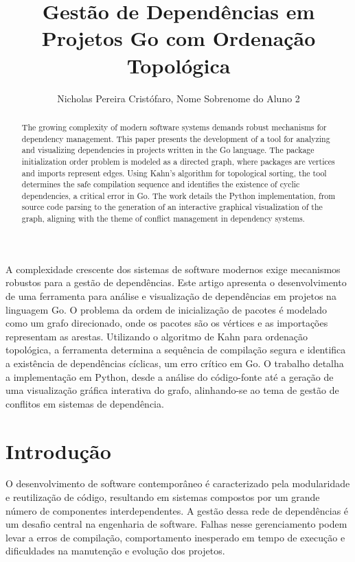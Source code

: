 \documentclass[12pt]{article}
\title{Gestão de Dependências em Projetos Go com Ordenação Topológica}
\author{Nicholas Pereira Cristófaro\inst{1}, Nome Sobrenome do Aluno 2\inst{1}}
\begin{document}
 

\maketitle

\begin{resumo} 
  A complexidade crescente dos sistemas de software modernos exige mecanismos robustos para a gestão de dependências. Este artigo apresenta o desenvolvimento de uma ferramenta para análise e visualização de dependências em projetos na linguagem Go. O problema da ordem de inicialização de pacotes é modelado como um grafo direcionado, onde os pacotes são os vértices e as importações representam as arestas. Utilizando o algoritmo de Kahn para ordenação topológica, a ferramenta determina a sequência de compilação segura e identifica a existência de dependências cíclicas, um erro crítico em Go. O trabalho detalha a implementação em Python, desde a análise do código-fonte até a geração de uma visualização gráfica interativa do grafo, alinhando-se ao tema de gestão de conflitos em sistemas de dependência.
\end{resumo}

\begin{abstract}
  The growing complexity of modern software systems demands robust mechanisms for dependency management. This paper presents the development of a tool for analyzing and visualizing dependencies in projects written in the Go language. The package initialization order problem is modeled as a directed graph, where packages are vertices and imports represent edges. Using Kahn's algorithm for topological sorting, the tool determines the safe compilation sequence and identifies the existence of cyclic dependencies, a critical error in Go. The work details the Python implementation, from source code parsing to the generation of an interactive graphical visualization of the graph, aligning with the theme of conflict management in dependency systems.
\end{abstract}


\section{Introdução}

O desenvolvimento de software contemporâneo é caracterizado pela modularidade e reutilização de código, resultando em sistemas compostos por um grande número de componentes interdependentes. A gestão dessa rede de dependências é um desafio central na engenharia de software. Falhas nesse gerenciamento podem levar a erros de compilação, comportamento inesperado em tempo de execução e dificuldades na manutenção e evolução dos projetos.
\end{document}

